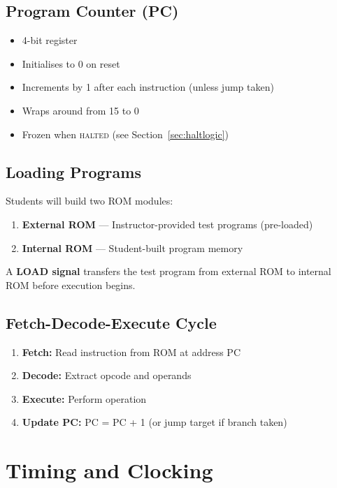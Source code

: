 \documentclass[11pt,a4paper]{article}
\newcommand{\signal}[1]{\textsc{#1}}
\begin{document}
\subsection{Program Counter (PC)}

\begin{itemize}[nosep]
  \item 4-bit register
  \item Initialises to 0 on reset
  \item Increments by 1 after each instruction (unless jump taken)
  \item Wraps around from 15 to 0
  \item Frozen when \signal{halted} (see Section~\ref{sec:haltlogic})
\end{itemize}

\subsection{Loading Programs}

Students will build two ROM modules:
\begin{enumerate}[nosep]
  \item \textbf{External ROM} --- Instructor-provided test programs (pre-loaded)
  \item \textbf{Internal ROM} --- Student-built program memory
\end{enumerate}

A \textbf{LOAD signal} transfers the test program from external ROM to internal ROM before execution begins.

\subsection{Fetch-Decode-Execute Cycle}

\begin{enumerate}[nosep]
  \item \textbf{Fetch:} Read instruction from ROM at address PC
  \item \textbf{Decode:} Extract opcode and operands
  \item \textbf{Execute:} Perform operation
  \item \textbf{Update PC:} PC = PC + 1 (or jump target if branch taken)
\end{enumerate}

\section{Timing and Clocking}
\end{document}
